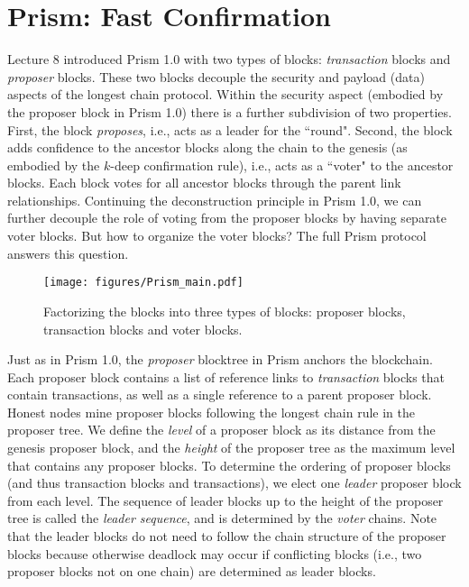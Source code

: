 \documentclass{article}
\begin{document}
\section*{Prism: Fast Confirmation}

Lecture 8 introduced {\sf Prism 1.0} with two types of blocks: {\em transaction} blocks and {\em proposer} blocks. These two blocks decouple the security and payload (data) aspects of the longest chain protocol. Within the security aspect (embodied by the proposer block in {\sf Prism 1.0}) there is a further subdivision of two properties. First, the block {\em proposes}, i.e., acts as a leader for the ``round". Second, the block   adds confidence to the ancestor blocks along the chain to the genesis (as embodied by the   $k$-deep confirmation rule), i.e., acts as a ``voter" to the ancestor blocks.   Each block votes for all ancestor blocks through the parent link relationships. Continuing the deconstruction principle  in {\sf Prism 1.0}, we can further decouple the role of voting from the proposer blocks by having separate voter blocks. But how to organize the voter blocks? The full Prism protocol answers this question.


\begin{figure}
\begin{center}
\texttt{[image: figures/Prism\_main.pdf]}
\end{center}

\caption{Factorizing the blocks into three types of blocks: proposer blocks, transaction blocks and voter blocks.}
\label{fig:prism}

\end{figure}

Just as in {\sf Prism 1.0}, the \textit{proposer} blocktree in {\sf Prism} anchors the blockchain.  Each proposer block contains a list of reference links to \textit{transaction} blocks that contain transactions, as well as a single reference to a parent proposer block. Honest nodes mine proposer blocks following the longest chain rule in the proposer tree.
We define the \emph{level} of a proposer block as its distance from the genesis proposer block, and the \emph{height} of the proposer tree as the maximum level that contains any proposer blocks. To determine the ordering of proposer blocks (and thus transaction blocks and transactions), we elect one \textit{leader} proposer block from each level. The sequence of leader blocks up to the height of the proposer tree is called the  \textit{leader sequence}, and is determined by the \emph{voter} chains. Note that the leader blocks do not need to follow the chain structure of the proposer blocks because otherwise deadlock may occur if conflicting blocks (i.e., two proposer blocks not on one chain) are determined as leader blocks. 
\end{document}
